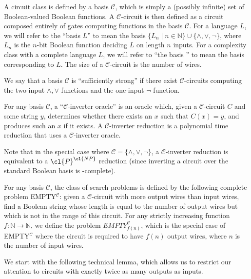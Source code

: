 \begin{definition}
A circuit class is defined by a basis $\mathcal{C}$, which is simply a (possibly infinite) set of Boolean-valued Boolean functions. A $\mathcal{C}$-circuit is then defined as a circuit composed entirely of gates computing functions in the basis $\mathcal{C}$. For a language $L$, we will refer to the ``basis $L$'' to mean the basis $\{L_n \mid n \in \mathbb{N}\} \cup \{\land,\lor,\lnot\}$, where $L_n$ is the $n$-bit Boolean function deciding $L$ on length $n$ inputs. For a complexity class  with a complete language $L$, we will refer to ``the basis '' to mean the basis corresponding to $L$. The size of a $\mathcal{C}$-circuit is the number of wires.

We say that a basis $\mathcal{C}$ is ``sufficiently strong'' if there exist $\mathcal{C}$-circuits computing the two-input $\land, \lor$ functions and the one-input $\lnot$ function.

For any basis $\mathcal{C}$, a ``$\mathcal{C}$-inverter oracle'' is an oracle which, given a $\mathcal{C}$-circuit $C$ and some string $y$, determines whether there exists an $x$ such that $C(x)=y$, and produces such an $x$ if it exists. A $\mathcal{C}$-inverter reduction is a polynomial time reduction that uses a $\mathcal{C}$-inverter oracle.
\end{definition}

Note that in the special case where $\mathcal{C} = \{\land, \lor, \lnot\}$, a $\mathcal{C}$-inverter reduction is equivalent to a $\cl{P}^\cl{NP}$ reduction (since inverting a circuit over the standard Boolean basis is -complete).

\begin{definition}
For any basis $\mathcal{C}$, the class of search problems  is defined by the following complete problem {\sc EMPTY$^{\mathcal{C}}$}: given a $\mathcal{C}$-circuit with more output wires than input wires, find a Boolean string whose length is equal to the number of output wires but which is not in the range of this circuit. For any strictly increasing function $f: \mathbb{N} \rightarrow \mathbb{N}$, we define the problem {\sc $EMPTY^{\mathcal{C}}_{f(n)}$}, which is the special case of {\sc EMPTY$^{\mathcal{C}}$} where the circuit is required to have $f(n)$ output wires, where $n$ is the number of input wires.
\end{definition}

We start with the following technical lemma, which allows us to restrict our attention to circuits with exactly twice as many outputs as inputs.

